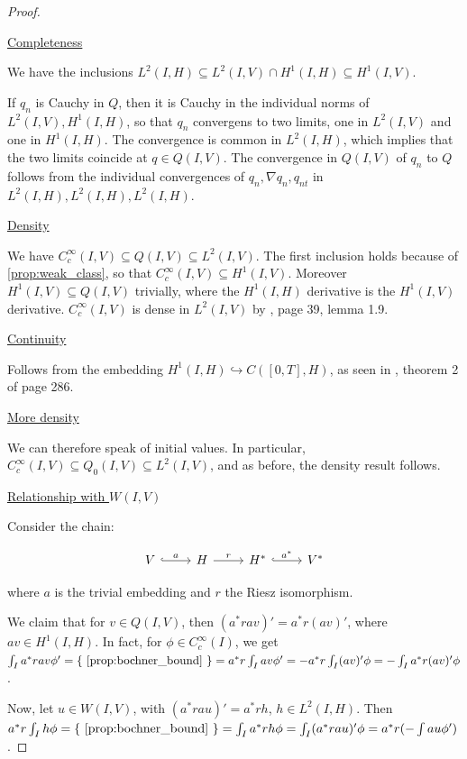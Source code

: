 \documentclass[english,a4paper,12pt,oneside]{scrbook}
\theoremstyle{break}
\newenvironment{mproof}[1][\proofname]{%
  \begin{proof}[#1]$ $\par\nobreak\ignorespaces
}{%
  \end{proof}
}
\renewcommand*{\proofname}{Proof}
\theoremstyle{remark}
\newcommand{\emb}{\hookrightarrow}
\newcommand{\ind}[1]{\{\text{ #1 }\}}
\begin{document}
\begin{mproof}

\underline{Completeness}

We have the inclusions $L^2(I,H)\subseteq L^2(I,V)\cap H^1(I,H)\subseteq H^1(I,V)$.

If $q_n$ is Cauchy in $Q$, then it is Cauchy in the individual norms of $ L^2(I,V), H^1(I,H)$, so that $q_n$ convergens to two limits, one in $L^2(I,V)$ and one in $H^1(I,H)$. The convergence is common in $L^2(I,H)$, which implies that the two limits coincide at $q \in Q(I,V)$. The convergence in $Q(I,V)$ of $q_n$ to $Q$ follows from the individual convergences of $q_n, \nabla q_n, q_{nt}$ in $ L^2(I,H), L^2(I,H),L^2(I,H)$.

\underline{Density}

We have $C_c^\infty(I,V) \subseteq Q(I,V) \subseteq L^2(I,V)$. The first inclusion holds because of \cref{prop:weak_class}, so that $C_c^\infty(I,V)\subseteq H^1(I,V)$. Moreover $H^1(I,V)\subseteq  Q(I,V) $ trivially, where the $H^1(I,H)$ derivative is the $H^1(I,V)$ derivative. $C_c^\infty(I,V)$ is dense in $ L^2(I,V)$ by \cite{hinze}, page 39, lemma 1.9.

\underline{Continuity}

Follows from the embedding $H^1(I,H)\emb C([0,T],H)$, as seen in \cite{evans}, theorem 2 of page 286.

\underline{More density}

We can therefore speak of initial values. In particular,  $C_c^\infty(I,V) \subseteq Q_0(I,V)\subseteq L^2(I,V)$, and as before, the density result follows.

\underline{Relationship with $W(I,V)$}

Consider the chain:

\[\begin{tikzcd}
	V & H & {H^*} & {V^*}
	\arrow["a", hook, from=1-1, to=1-2]
	\arrow["r", from=1-2, to=1-3]
	\arrow["{a^*}", hook, from=1-3, to=1-4]
\end{tikzcd}\]

where $a$ is the trivial embedding and $r$ the Riesz isomorphism.

We claim that for $v \in Q(I,V)$, then $(a^*ra v)' = a^*r (av)'$, where $av \in H^1(I,H)$. In fact, for $\phi \in C^\infty_c(I)$, we get $\int_I a^*ra v \phi' = \ind{\ref{prop:bochner_bound}} = a^*r\int_I av\phi' = -a^*r\int_I(av)'\phi =-\int_I a^*r(av)' \phi$.

Now, let $u \in W(I,V)$, with $(a^*ra u)' = a^*r h$, $h \in L^2(I,H)$. Then $ a^*r \int_I h \phi = \ind{\ref{prop:bochner_bound}} = \int_I a^*r h \phi  = \int_I (a^*ra u)' \phi =  a^*r (-\int au \phi')$.


\end{mproof}
\end{document}
